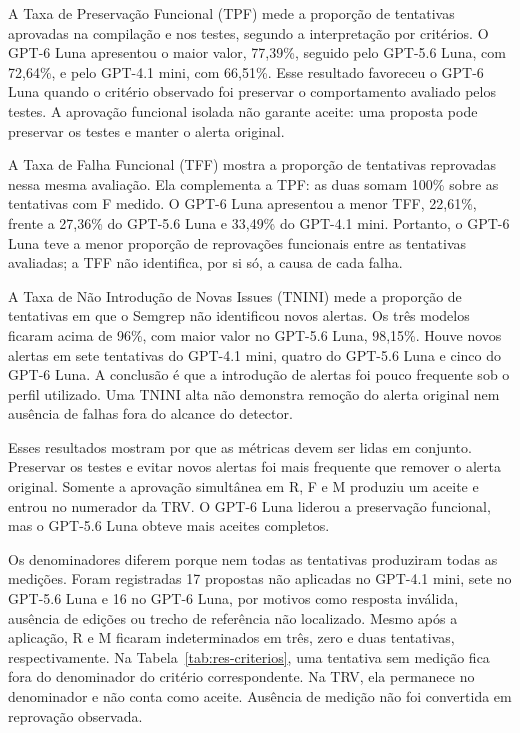 A Taxa de Preservação Funcional (TPF) mede a proporção de tentativas aprovadas na compilação e nos testes, segundo a interpretação por critérios. O GPT-6 Luna apresentou o maior valor, 77,39\%, seguido pelo GPT-5.6 Luna, com 72,64\%, e pelo GPT-4.1 mini, com 66,51\%. Esse resultado favoreceu o GPT-6 Luna quando o critério observado foi preservar o comportamento avaliado pelos testes. A aprovação funcional isolada não garante aceite: uma proposta pode preservar os testes e manter o alerta original.

A Taxa de Falha Funcional (TFF) mostra a proporção de tentativas reprovadas nessa mesma avaliação. Ela complementa a TPF: as duas somam 100\% sobre as tentativas com F medido. O GPT-6 Luna apresentou a menor TFF, 22,61\%, frente a 27,36\% do GPT-5.6 Luna e 33,49\% do GPT-4.1 mini. Portanto, o GPT-6 Luna teve a menor proporção de reprovações funcionais entre as tentativas avaliadas; a TFF não identifica, por si só, a causa de cada falha.

A Taxa de Não Introdução de Novas Issues (TNINI) mede a proporção de tentativas em que o Semgrep não identificou novos alertas. Os três modelos ficaram acima de 96\%, com maior valor no GPT-5.6 Luna, 98,15\%. Houve novos alertas em sete tentativas do GPT-4.1 mini, quatro do GPT-5.6 Luna e cinco do GPT-6 Luna. A conclusão é que a introdução de alertas foi pouco frequente sob o perfil utilizado. Uma TNINI alta não demonstra remoção do alerta original nem ausência de falhas fora do alcance do detector.

Esses resultados mostram por que as métricas devem ser lidas em conjunto. Preservar os testes e evitar novos alertas foi mais frequente que remover o alerta original. Somente a aprovação simultânea em R, F e M produziu um aceite e entrou no numerador da TRV. O GPT-6 Luna liderou a preservação funcional, mas o GPT-5.6 Luna obteve mais aceites completos.

Os denominadores diferem porque nem todas as tentativas produziram todas as medições. Foram registradas 17 propostas não aplicadas no GPT-4.1 mini, sete no GPT-5.6 Luna e 16 no GPT-6 Luna, por motivos como resposta inválida, ausência de edições ou trecho de referência não localizado. Mesmo após a aplicação, R e M ficaram indeterminados em três, zero e duas tentativas, respectivamente. Na Tabela~\ref{tab:res-criterios}, uma tentativa sem medição fica fora do denominador do critério correspondente. Na TRV, ela permanece no denominador e não conta como aceite. Ausência de medição não foi convertida em reprovação observada.

